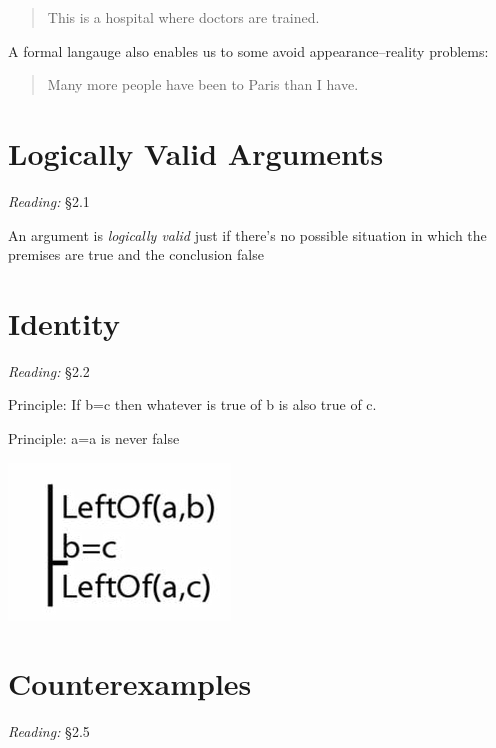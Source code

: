\documentclass[12pt]{extarticle}
\begin{document}
\begin{multicols*}{3}
\begin{quote}
 
This is a hospital where doctors are trained.
 
\end{quote}
 
A formal langauge also enables us to some avoid appearance--reality problems:
 
\begin{quote}
 
Many more people have been to Paris than I have.
 
\end{quote}
 
 
 
\section{Logically Valid Arguments}
 
\emph{Reading:} §2.1
 
An argument is \emph{logically valid} just if there’s no possible situation in which the premises are true and the conclusion false
 
 
 
\section{Identity}
 
\emph{Reading:} §2.2
 
Principle: If b=c then whatever is true of b is also true of c.
 
Principle: a=a is never false
 
\begin{center}
\includegraphics[scale=0.3]{img/arg_identity.png}
\end{center}
 
 
\section{Counterexamples}
 
\emph{Reading:} §2.5
 

\end{multicols*}
\end{document}
